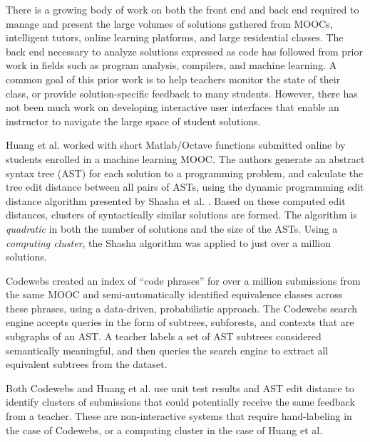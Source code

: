 \documentclass{sigchi}
\begin{document}
There is a growing body of work on both the front end and back end required to manage and present the large volumes of solutions gathered from MOOCs, intelligent tutors, online learning platforms, and large residential classes. The back end necessary to analyze solutions expressed as code has followed from prior work in fields such as program analysis, compilers, and machine learning. A common goal of this prior work is to help teachers monitor the state of their class, or provide solution-specific feedback to many students. However, there has not been much work on developing interactive user interfaces that enable an instructor to navigate the large space of student solutions.

Huang et al. \citeyear{MOOCshop} worked with short Matlab/Octave functions submitted online by students enrolled in a machine learning MOOC. The authors generate an abstract syntax tree (AST) for each solution to a programming problem, and calculate the tree edit distance between all pairs of ASTs, using the dynamic programming edit distance algorithm presented by Shasha et al. \citeyear{shasha1994exact}. Based on these computed edit distances, clusters of syntactically similar solutions are formed. The algorithm is \emph{quadratic} in both the number of solutions and the size of the ASTs. Using a \emph{computing cluster}, the Shasha algorithm was applied to just over a million solutions.

Codewebs \cite{codewebs} created an index of ``code phrases'' for over a million submissions from the same MOOC and semi-automatically identified equivalence classes across these phrases, using a data-driven, probabilistic approach. The Codewebs search engine accepts queries in the form of subtrees, subforests, and contexts that are subgraphs of an AST. A teacher labels a set of AST subtrees considered semantically meaningful, and then queries the search engine to extract all equivalent subtrees from the dataset.

Both Codewebs \cite{codewebs} and Huang et al. \citeyear{MOOCshop} use unit test results and AST edit distance to identify clusters of submissions that could potentially receive the same feedback from a teacher. These are non-interactive systems that require hand-labeling in the case of Codewebs, or a computing cluster in the case of Huang et al.
\end{document}
